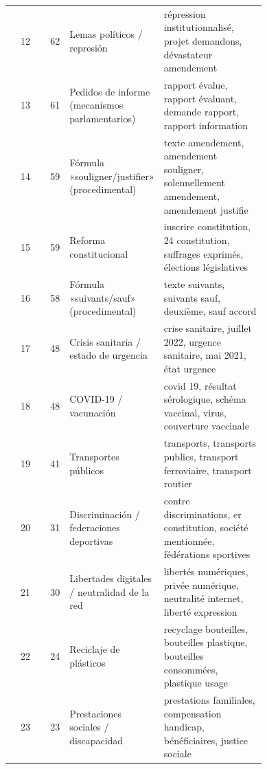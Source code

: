 {\begin{longtable}{@{}r r >{\raggedright\arraybackslash}p{0.34\linewidth} >{\raggedright\arraybackslash}p{0.40\linewidth}@{}}
12 & 62 & Lemas políticos / represión & répression institutionnalisé, projet demandons, dévastateur amendement \\
13 & 61 & Pedidos de informe (mecanismos parlamentarios) & rapport évalue, rapport évaluant, demande rapport, rapport information \\
14 & 59 & Fórmula «souligner/justifier» (procedimental) & texte amendement, amendement souligner, solennellement amendement, amendement justifie \\
15 & 59 & Reforma constitucional & inscrire constitution, 24 constitution, suffrages exprimés, élections législatives \\
16 & 58 & Fórmula «suivants/sauf» (procedimental) & texte suivants, suivants sauf, deuxième, sauf accord \\
17 & 48 & Crisis sanitaria / estado de urgencia & crise sanitaire, juillet 2022, urgence sanitaire, mai 2021, état urgence \\
18 & 48 & COVID-19 / vacunación & covid 19, résultat sérologique, schéma vaccinal, virus, couverture vaccinale \\
19 & 41 & Transportes públicos & 1115 transports, transports publics, transport ferroviaire, transport routier \\
20 & 31 & Discriminación / federaciones deportivas & contre discriminations, er constitution, société mentionnée, fédérations sportives \\
21 & 30 & Libertades digitales / neutralidad de la red & libertés numériques, privée numérique, neutralité internet, liberté expression \\
22 & 24 & Reciclaje de plásticos & recyclage bouteilles, bouteilles plastique, bouteilles consommées, plastique usage \\
23 & 23 & Prestaciones sociales / discapacidad & prestations familiales, compensation handicap, bénéficiaires, justice sociale \\
\end{longtable}
}

